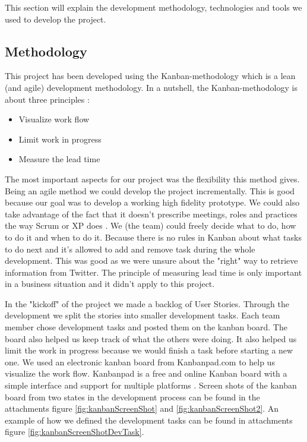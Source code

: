
This section will explain the development methodology, technologies and tools we used to develop the project. 

\subsection{Methodology}


This project has been developed using the Kanban-methodology which is a lean (and agile) development methodology. In a nutshell, the Kanban-methodology is about three principles \citep{Kniberg2010}: 
\begin{itemize}
\item Visualize work flow 
\item Limit work in progress 
\item Measure the lead time
\end{itemize}

The most important aspects for our project was the flexibility this method gives. Being an agile method we could develop the project incrementally. This is good because our goal was to develop a working high fidelity prototype. We could also take advantage of the fact that it doesn't prescribe meetings, roles and practices the way Scrum or XP does \citep{Abrahamsson2002}. We (the team) could freely decide what to do, how to do it and when to do it. Because there is no rules in Kanban about what tasks to do next and it's allowed to add and remove task during the whole development. This was good as we were unsure about the "right" way to retrieve information from Twitter. The principle of measuring lead time is only important in a business situation and it didn't apply to this project.  

In the "kickoff" of the project we made a backlog of User Stories. Through the development we split the stories into smaller development tasks. Each team member chose development tasks and posted them on the kanban board. The board also helped us keep track of what the others were doing. It also helped us limit the work in progress because we would finish a task before starting a new one. We used an electronic kanban board from Kanbanpad.com \citep{TheHybridGroup2012} to help us visualize the work flow. Kanbanpad is a free and online Kanban board with a simple interface and support for multiple platforms \citep{TheHybridGroup2012}. Screen shots of the kanban board from two states in the development process can be found in the attachments figure \ref{fig:kanbanScreenShot} and \ref{fig:kanbanScreenShot2}. An example of how we defined the development tasks can be found in attachments figure \ref{fig:kanbanScreenShotDevTask}. 


